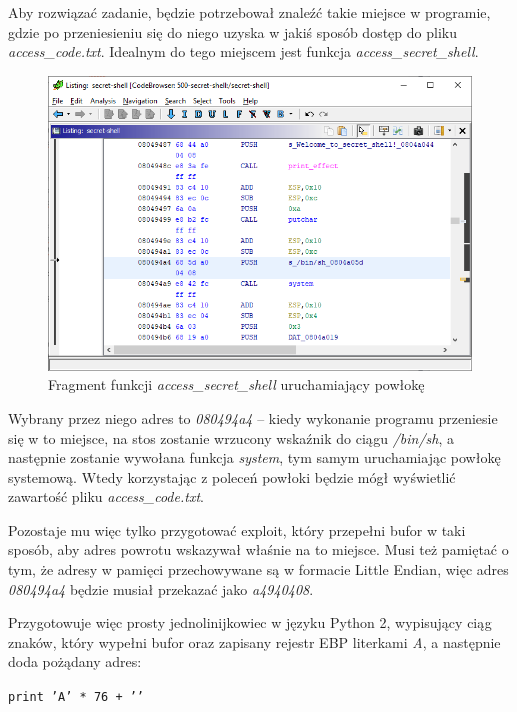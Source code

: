 \documentclass[language=polish,type=eng]{aghmodern}
\begin{document}
Aby rozwiązać zadanie, będzie potrzebował znaleźć takie miejsce w programie, gdzie
po przeniesieniu się do niego uzyska w jakiś sposób dostęp do pliku \emph{access\_code.txt}.
Idealnym do tego miejscem jest funkcja \emph{access\_secret\_shell}.

\begin{figure}[H]
\centering
\includegraphics[width=\textwidth]{500_bin_sh_address}
\caption{Fragment funkcji \emph{access\_secret\_shell} uruchamiający powłokę}
\end{figure}

Wybrany przez niego adres to \emph{080494a4} -- kiedy wykonanie programu przeniesie się w to miejsce,
na stos zostanie wrzucony wskaźnik do ciągu \emph{/bin/sh}, a następnie zostanie wywołana
funkcja \emph{system}, tym samym uruchamiając powłokę systemową. Wtedy korzystając z poleceń
powłoki będzie mógł wyświetlić zawartość pliku \emph{access\_code.txt}.

Pozostaje mu więc tylko przygotować exploit, który przepełni bufor
w taki sposób, aby adres powrotu wskazywał właśnie na to miejsce. Musi też pamiętać
o tym, że adresy w pamięci przechowywane są w formacie Little Endian, więc adres
\emph{080494a4} będzie musiał przekazać jako \emph{a4940408}.

Przygotowuje więc prosty jednolinijkowiec w języku Python 2, wypisujący ciąg znaków,
który wypełni bufor oraz zapisany rejestr EBP literkami \emph{A},
a następnie doda pożądany adres:

\texttt{print 'A' * 76 + ''}
\end{document}

